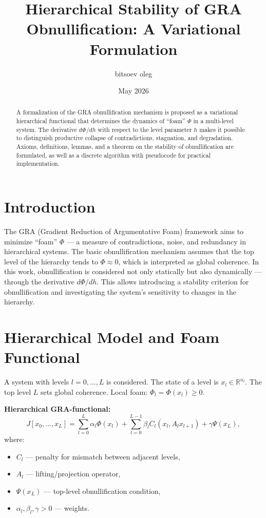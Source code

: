\documentclass[11pt,a4paper]{article}
\title{Hierarchical Stability of GRA Obnullification: A Variational Formulation}
\author{bitsoev oleg}
\date{May 2026}
\begin{document}
\maketitle

\begin{abstract}
A formalization of the GRA obnullification mechanism is proposed as a variational hierarchical functional that determines the dynamics of ``foam'' $\Phi$ in a multi-level system. The derivative $d\Phi/dh$ with respect to the level parameter $h$ makes it possible to distinguish productive collapse of contradictions, stagnation, and degradation. Axioms, definitions, lemmas, and a theorem on the stability of obnullification are formulated, as well as a discrete algorithm with pseudocode for practical implementation.
\end{abstract}

\section{Introduction}

The GRA (Gradient Reduction of Argumentative Foam) framework aims to minimize ``foam'' $\Phi$ --- a measure of contradictions, noise, and redundancy in hierarchical systems. The basic obnullification mechanism assumes that the top level of the hierarchy tends to $\Phi \approx 0$, which is interpreted as global coherence. In this work, obnullification is considered not only statically but also dynamically --- through the derivative $d\Phi/dh$. This allows introducing a stability criterion for obnullification and investigating the system's sensitivity to changes in the hierarchy.

\section{Hierarchical Model and Foam Functional}

A system with levels $l = 0,\dots,L$ is considered. The state of a level is $x_l \in \mathbb{R}^{n_l}$. The top level $L$ sets global coherence. Local foam: $\Phi_l = \Phi(x_l) \geq 0$. 

\textbf{Hierarchical GRA-functional:}
\begin{equation}
J[x_0,\dots,x_L] = \sum_{l=0}^L \alpha_l \Phi(x_l) + \sum_{l=0}^{L-1} \beta_l C_l(x_l, A_l x_{l+1}) + \gamma \Psi(x_L),
\label{eq:gra-functional}
\end{equation}
where:
\begin{itemize}
    \item $C_l$ --- penalty for mismatch between adjacent levels,
    \item $A_l$ --- lifting/projection operator,
    \item $\Psi(x_L)$ --- top-level obnullification condition,
    \item $\alpha_l, \beta_l, \gamma > 0$ --- weights.
\end{itemize}
\end{document}
